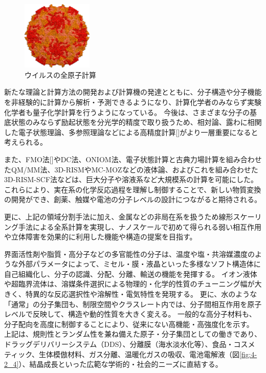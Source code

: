 \begin{figure}[H]
  \centering
  \includegraphics[width=0.3\textwidth]{figs/4-2_3.pdf}
  \caption{ウイルスの全原子計算}
  \label{fig:4-2_3}
\end{figure}


新たな理論と計算方法の開発および計算機の発達とともに、分子構造や分子機能を非経験的に計算から解析・予測できるようになり、計算化学者のみならず実験化学者も量子化学計算を行うようになっている。
今後は、さまざまな分子の基底状態のみならず励起状態を分光学的精度で取り扱うため、相対論、露わに相関した電子状態理論、多参照理論などによる高精度計算[]がより一層重要になると考えられる。

また、FMO法[]やDC法、ONIOM法、電子状態計算と古典力場計算を組み合わせたQM/MM法、3D-RISMやMC-MOZなどの液体論、およびこれを組み合わせた3D-RISM-SCF法などは、巨大分子や溶液系など大規模系の計算を可能にした。
これらにより、実在系の化学反応過程を理解し制御することで、新しい物質変換の開発ができ、創薬、触媒や電池の分子レベルの設計につながると期待される。

更に、上記の領域分割手法に加え、金属などの非局在系を扱うため線形スケーリング手法による全系計算を実現し、ナノスケールで初めて得られる弱い相互作用や立体障害を効果的に利用した機能や構造の提案を目指す。


界面活性剤や脂質・高分子などの多官能性の分子は、温度や塩・共溶媒濃度のような外部パラメータによって、ミセル・膜・液晶といった多様なソフト構造体に自己組織化し、分子の認識、分配、分離、輸送の機能を発揮する。
イオン液体や超臨界流体は、溶媒条件選択による物理的・化学的性質のチューニング幅が大きく、特異的な反応選択性や溶解性・電気特性を発現する。
更に、水のような「通常」の分子集団も、制限空間やクラスレート内では、分子間相互作用を原子レベルで反映して、構造や動的性質を大きく変える。
一般的な高分子材料も、分子配向を高度に制御することにより、従来にない高機能・高強度化を示す。
上記は、規則性とランダム性を兼ね備えた原子・分子集団としての働きであり、ドラッグデリバリーシステム（DDS）、分離膜（海水淡水化等）、食品・コスメティック、生体模倣材料、ガス分離、温暖化ガスの吸収、電池電解液（図\ref{fig:4-2_4}）、結晶成長といった広範な学術的・社会的ニーズに直結する。

